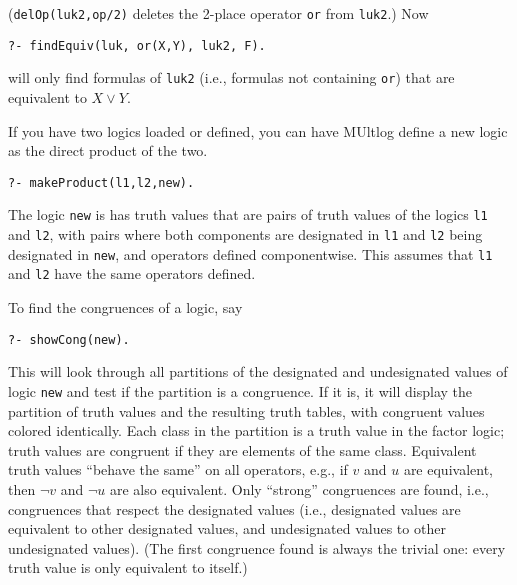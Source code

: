 \documentclass[
]{article}
\newcommand{\passthrough}[1]{#1}
\begin{document}
(\passthrough{\lstinline!delOp(luk2,op/2)!} deletes the 2-place operator
\passthrough{\lstinline!or!} from \passthrough{\lstinline!luk2!}.) Now

\begin{lstlisting}
?- findEquiv(luk, or(X,Y), luk2, F).
\end{lstlisting}

will only find formulas of \passthrough{\lstinline!luk2!} (i.e.,
formulas not containing \passthrough{\lstinline!or!}) that are
equivalent to \(X \lor Y\).

If you have two logics loaded or defined, you can have MUltlog define a
new logic as the direct product of the two.

\begin{lstlisting}
?- makeProduct(l1,l2,new).
\end{lstlisting}

The logic \passthrough{\lstinline!new!} is has truth values that are
pairs of truth values of the logics \passthrough{\lstinline!l1!} and
\passthrough{\lstinline!l2!}, with pairs where both components are
designated in \passthrough{\lstinline!l1!} and
\passthrough{\lstinline!l2!} being designated in
\passthrough{\lstinline!new!}, and operators defined componentwise. This
assumes that \passthrough{\lstinline!l1!} and
\passthrough{\lstinline!l2!} have the same operators defined.

To find the congruences of a logic, say

\begin{lstlisting}
?- showCong(new).
\end{lstlisting}

This will look through all partitions of the designated and undesignated
values of logic \passthrough{\lstinline!new!} and test if the partition
is a congruence. If it is, it will display the partition of truth values
and the resulting truth tables, with congruent values colored
identically. Each class in the partition is a truth value in the factor
logic; truth values are congruent if they are elements of the same
class. Equivalent truth values ``behave the same'' on all operators,
e.g., if \(v\) and \(u\) are equivalent, then \(\lnot v\) and
\(\lnot u\) are also equivalent. Only ``strong'' congruences are found,
i.e., congruences that respect the designated values (i.e., designated
values are equivalent to other designated values, and undesignated
values to other undesignated values). (The first congruence found is
always the trivial one: every truth value is only equivalent to itself.)
\end{document}
